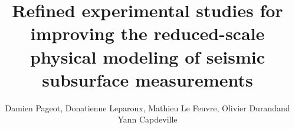 \documentclass[paper,extra]{gji} %
\begin{document}
\title{Refined experimental studies for improving the reduced-scale physical modeling of seismic subsurface measurements}



\author{Damien Pageot\footnotemark[1]\footnotemark[2], Donatienne Leparoux\footnotemark[1], Mathieu Le Feuvre\footnotemark[1], Olivier Durand\footnotemark[1] and Yann Capdeville\footnotemark[3]}


\maketitle
\end{document}
